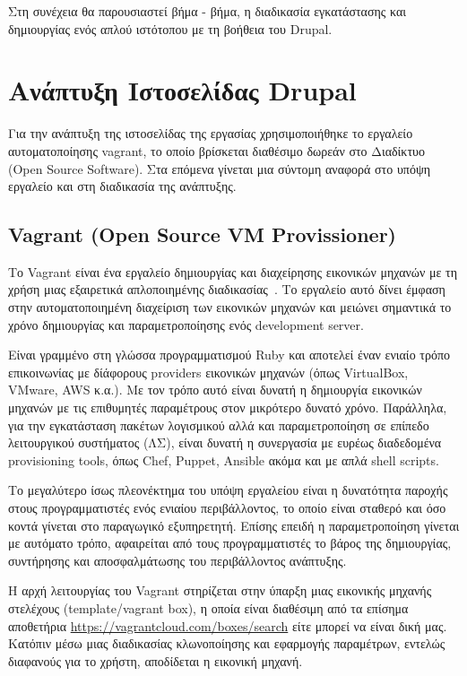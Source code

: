 \documentclass[12pt]{report}
\begin{document}
Στη συνέχεια θα παρουσιαστεί βήμα - βήμα, η διαδικασία εγκατάστασης και δημιουργίας ενός απλού ιστότοπου με τη βοήθεια του \textlatin{Drupal}.

\chapter{Ανάπτυξη Ιστοσελίδας \textlatin{Drupal}}\label{ch3}
Για την ανάπτυξη της ιστοσελίδας της εργασίας χρησιμοποιήθηκε το εργαλείο αυτοματοποίησης \textlatin{vagrant}, το οποίο βρίσκεται διαθέσιμο δωρεάν στο Διαδίκτυο (\textlatin{Open Source Software}). Στα επόμενα γίνεται μια σύντομη αναφορά στο υπόψη εργαλείο και στη διαδικασία της ανάπτυξης.

\section{\textlatin{\textlatin{Vagrant (Open Source VM Provissioner)}}}\label{vagrant}
Το \textlatin{Vagrant} είναι ένα εργαλείο δημιουργίας και διαχείρησης εικονικών μηχανών με τη χρήση μιας εξαιρετικά απλοποιημένης διαδικασίας~\cite{vagrant_by_hashicorp}. Το εργαλείο αυτό δίνει έμφαση στην αυτοματοποιημένη διαχείριση των εικονικών μηχανών και μειώνει σημαντικά το χρόνο δημιουργίας και παραμετροποίησης ενός \textlatin{development server}.

Είναι γραμμένο στη γλώσσα προγραμματισμού \textlatin{Ruby} και αποτελεί έναν ενιαίο τρόπο επικοινωνίας με δίάφορους \textlatin{providers} εικονικών μηχανών (όπως \textlatin{VirtualBox, VMware, AWS} κ.α.). Με τον τρόπο αυτό είναι δυνατή η δημιουργία εικονικών μηχανών με τις επιθυμητές παραμέτρους στον μικρότερο δυνατό χρόνο. Παράλληλα, για την εγκατάσταση πακέτων λογισμικού αλλά και παραμετροποίηση σε επίπεδο λειτουργικού συστήματος (ΛΣ), είναι δυνατή η συνεργασία με ευρέως διαδεδομένα \textlatin{provisioning tools}, όπως \textlatin{Chef, Puppet, Ansible} ακόμα και με απλά \textlatin{shell scripts}.

Το μεγαλύτερο ίσως πλεονέκτημα του υπόψη εργαλείου είναι η δυνατότητα παροχής στους προγραμματιστές ενός ενιαίου περιβάλλοντος, το οποίο είναι σταθερό και όσο κοντά γίνεται στο παραγωγικό εξυπηρετητή. Επίσης επειδή η παραμετροποίηση γίνεται με αυτόματο τρόπο, αφαιρείται από τους προγραμματιστές το βάρος της δημιουργίας, συντήρησης και αποσφαλμάτωσης του περιβάλλοντος ανάπτυξης.

Η αρχή λειτουργίας του \textlatin{Vagrant} στηρίζεται στην ύπαρξη μιας εικονικής μηχανής στελέχους (\textlatin{template/vagrant box}), η οποία είναι διαθέσιμη από τα επίσημα αποθετήρια \textlatin{\url{https://vagrantcloud.com/boxes/search}} είτε μπορεί να είναι δική μας. Κατόπιν μέσω μιας διαδικασίας κλωνοποίησης και εφαρμογής παραμέτρων, εντελώς διαφανούς για το χρήστη, αποδίδεται η εικονική μηχανή.
\end{document}

